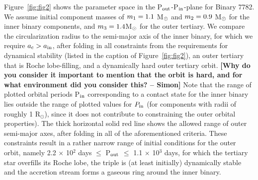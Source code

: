 \documentclass{aastex62}
\def\simon#1{{\bf {\color{red}[#1 -- Simon]}}}
\begin{document}
Figure~\ref{fig:fig2} shows the parameter space in the P$_{\rm
  out}$-P$_{\rm in}$-plane for Binary 7782.  We assume initial
component masses of $m_{\rm 1} = 1.1$ M$_{\rm \odot}$ and $m_{\rm 2} =
0.9$ M$_{\rm \odot}$ for the inner binary components, and $m_{\rm 3} =
1.4 $M$_{\rm \odot}$ for the outer tertiary.  We compare the
circularization radius to the semi-major axis of the inner binary, for
which we require $a_{\rm c} > a_{\rm in}$, after folding in all
constraints from the requirements for dynamical stability (listed in
the caption of Figure~\ref{fig:fig2}), an outer tertiary that is Roche
lobe-filling, and a dynamically hard outer tertiary orbit.  \simon{Why
  do you consider it important to mention that the orbit is hard, and
  for what environment did you consider this?}  Note that the range of
plotted orbital periods P$_{\rm in}$ corresponding to a contact state
for the inner binary lies outside the range of plotted values for
$P_{\rm in}$ (for components with radii of roughly 1 R$_{\odot}$),
since it does not contribute to constraining the outer orbital
properties).  The thick horizontal solid red line shows the allowed
range of outer semi-major axes, after folding in all of 
the aforementioned criteria.  These constraints result in a rather narrow
range of initial conditions for the outer orbit, namely 2.2 $\times$
10$^{2}$ days $\le$ P$_{\rm out}$ $\le$ 1.1 $\times$ 10$^3$ days, for
which the tertiary star overfills its Roche lobe, the triple is (at
least initially) dynamically stable and the accretion stream forms a
gaseous ring around the inner binary.
\end{document}
